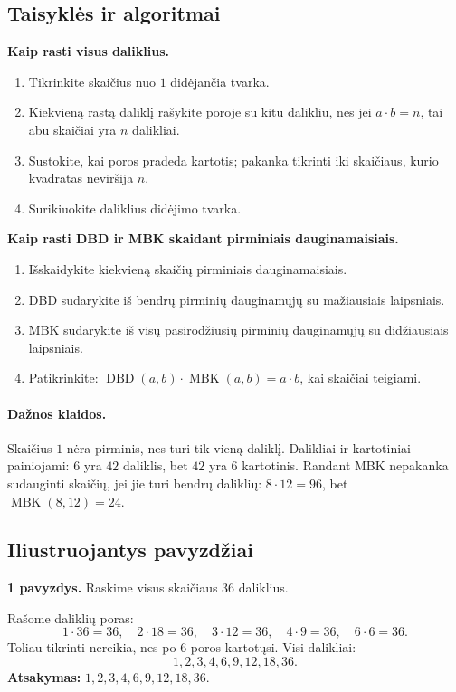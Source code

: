 \subsection{Taisyklės ir algoritmai}
\textbf{Kaip rasti visus daliklius.}
\begin{enumerate}[label=\arabic*.]
\item Tikrinkite skaičius nuo \(1\) didėjančia tvarka.
\item Kiekvieną rastą daliklį rašykite poroje su kitu dalikliu, nes jei \(a\cdot b=n\), tai abu skaičiai yra \(n\) dalikliai.
\item Sustokite, kai poros pradeda kartotis; pakanka tikrinti iki skaičiaus, kurio kvadratas neviršija \(n\).
\item Surikiuokite daliklius didėjimo tvarka.
\end{enumerate}

\textbf{Kaip rasti DBD ir MBK skaidant pirminiais dauginamaisiais.}
\begin{enumerate}[label=\arabic*.]
\item Išskaidykite kiekvieną skaičių pirminiais dauginamaisiais.
\item DBD sudarykite iš bendrų pirminių dauginamųjų su mažiausiais laipsniais.
\item MBK sudarykite iš visų pasirodžiusių pirminių dauginamųjų su didžiausiais laipsniais.
\item Patikrinkite: \(\operatorname{DBD}(a,b)\cdot \operatorname{MBK}(a,b)=a\cdot b\), kai skaičiai teigiami.
\end{enumerate}

\paragraph{Dažnos klaidos.}
Skaičius \(1\) nėra pirminis, nes turi tik vieną daliklį. Dalikliai ir kartotiniai painiojami: \(6\) yra \(42\) daliklis, bet \(42\) yra \(6\) kartotinis. Randant MBK nepakanka sudauginti skaičių, jei jie turi bendrų daliklių: \(8\cdot 12=96\), bet \(\operatorname{MBK}(8,12)=24\).

\subsection{Iliustruojantys pavyzdžiai}
\textbf{1 pavyzdys.} Raskime visus skaičiaus \(36\) daliklius.

Rašome daliklių poras:
\[
1\cdot 36=36,\quad 2\cdot 18=36,\quad 3\cdot 12=36,\quad 4\cdot 9=36,\quad 6\cdot 6=36.
\]
Toliau tikrinti nereikia, nes po \(6\) poros kartotųsi. Visi dalikliai:
\[
1,2,3,4,6,9,12,18,36.
\]
\textbf{Atsakymas:} \(1,2,3,4,6,9,12,18,36\).


